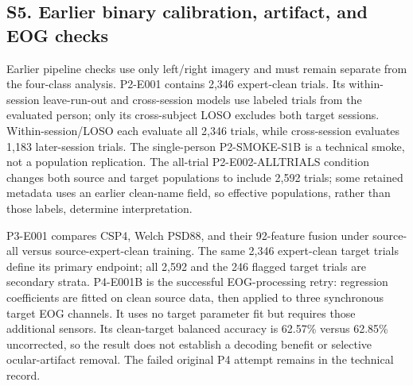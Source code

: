 \documentclass[11pt]{article}
\begin{document}
\subsection*{S5. Earlier binary calibration, artifact, and EOG checks}
Earlier pipeline checks use only left/right imagery and must remain separate from the four-class analysis. P2-E001 contains 2,346 expert-clean trials. Its within-session leave-run-out and cross-session models use labeled trials from the evaluated person; only its cross-subject LOSO excludes both target sessions. Within-session/LOSO each evaluate all 2,346 trials, while cross-session evaluates 1,183 later-session trials. The single-person P2-SMOKE-S1B is a technical smoke, not a population replication. The all-trial P2-E002-ALLTRIALS condition changes both source and target populations to include 2,592 trials; some retained metadata uses an earlier clean-name field, so effective populations, rather than those labels, determine interpretation.

P3-E001 compares CSP4, Welch PSD88, and their 92-feature fusion under source-all versus source-expert-clean training. The same 2,346 expert-clean target trials define its primary endpoint; all 2,592 and the 246 flagged target trials are secondary strata. P4-E001B is the successful EOG-processing retry: regression coefficients are fitted on clean source data, then applied to three synchronous target EOG channels. It uses no target parameter fit but requires those additional sensors. Its clean-target balanced accuracy is 62.57\% versus 62.85\% uncorrected, so the result does not establish a decoding benefit or selective ocular-artifact removal. The failed original P4 attempt remains in the technical record.
\end{document}
